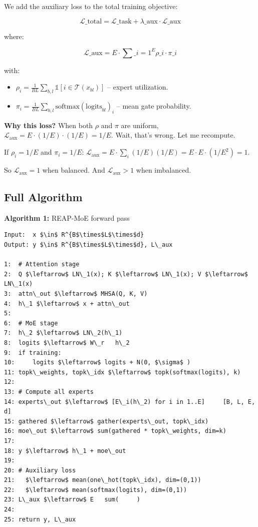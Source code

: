 We add the auxiliary loss to the total training objective:

\[
\mathcal{L}\_\text{total} = \mathcal{L}\_\text{task} + \lambda\_\text{aux} \cdot \mathcal{L}\_\text{aux}
\tag{4.12}
\]

where:

\[
\mathcal{L}\_\text{aux} = E \cdot \sum\_{i=1}^{E} \rho\_i \cdot \pi\_i
\tag{4.13}
\]

with:
\begin{itemize}
\item $\rho_i = \frac{1}{BL} \sum_{b,l} \mathbb{1}[i \in \mathcal{T}(x_{bl})]$ -- expert utilization.
\item $\pi_i = \frac{1}{BL} \sum_{b,l} \text{softmax}(\text{logits}_{bl})_i$ -- mean gate probability.

\end{itemize}
\textbf{Why this loss?} When both $\rho$ and $\pi$ are uniform, 
$\mathcal{L}_\text{aux} = E \cdot (1/E) \cdot (1/E) = 1/E$. Wait, that's 
wrong. Let me recompute.

If $\rho_i = 1/E$ and $\pi_i = 1/E$:
$\mathcal{L}_\text{aux} = E \cdot \sum_i (1/E)(1/E) = E \cdot E \cdot (1/E^2) = 1$.

So $\mathcal{L}_\text{aux} = 1$ when balanced. And $\mathcal{L}_\text{aux} > 1$ 
when imbalanced.

\subsection{Full Algorithm}

\textbf{Algorithm 1:} REAP-MoE forward pass
\begin{lstlisting}
Input:  x $\in$ R^{B$\times$L$\times$d}
Output: y $\in$ R^{B$\times$L$\times$d}, L\_aux

1:  # Attention stage
2:  Q $\leftarrow$ LN\_1(x); K $\leftarrow$ LN\_1(x); V $\leftarrow$ LN\_1(x)
3:  attn\_out $\leftarrow$ MHSA(Q, K, V)
4:  h\_1 $\leftarrow$ x + attn\_out
5:
6:  # MoE stage
7:  h\_2 $\leftarrow$ LN\_2(h\_1)
8:  logits $\leftarrow$ W\_r   h\_2
9:  if training:
10:     logits $\leftarrow$ logits + N(0, $\sigma$ )
11: topk\_weights, topk\_idx $\leftarrow$ topk(softmax(logits), k)
12:
13: # Compute all experts
14: experts\_out $\leftarrow$ [E\_i(h\_2) for i in 1..E]     [B, L, E, d]
15: gathered $\leftarrow$ gather(experts\_out, topk\_idx)
16: moe\_out $\leftarrow$ sum(gathered * topk\_weights, dim=k)
17:
18: y $\leftarrow$ h\_1 + moe\_out
19:
20: # Auxiliary loss
21:   $\leftarrow$ mean(one\_hot(topk\_idx), dim=(0,1))
22:   $\leftarrow$ mean(softmax(logits), dim=(0,1))
23: L\_aux $\leftarrow$ E   sum(     )
24:
25: return y, L\_aux
\end{lstlisting}

